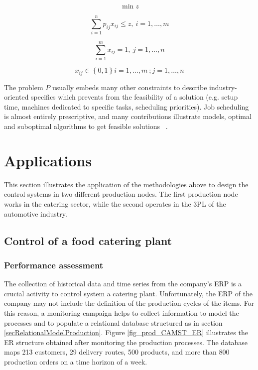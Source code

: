 \begin{equation}
    \min{z}
\end{equation}

\begin{equation}
    \sum_{i=1}^{n}{p_{ij}x_{ij}\le z,\ i=1,\ldots,m}
\end{equation}

\begin{equation}
    \sum_{i=1}^{m}{x_{ij}=1,\ j=1,\ldots,n}
\end{equation}

\begin{equation}
    x_{ij}\in\left\{0,1\right\}i=1,\ldots,m\ ;j=1,\ldots,n
\end{equation}

The problem $P$ usually embeds many other constraints to describe industry-oriented specifics which prevents from the feasibility of a solution (e.g. setup time, machines dedicated to specific tasks, scheduling priorities). Job scheduling is almost entirely prescriptive, and many contributions illustrate models, optimal and suboptimal algorithms to get feasible solutions ~\cite{Pinedo2009}.

\section{Applications}
This section illustrates the application of the methodologies above to design the control systems in two different production nodes. The first production node works in the catering sector, while the second operates in the 3PL of the automotive industry.

\subsection{Control of a food catering plant}

\subsubsection{Performance assessment}

The collection of historical data and time series from the company’s ERP is a crucial activity to control system a catering plant. Unfortunately, the ERP of the company may not include the definition of the production cycles of the items. For this reason, a monitoring campaign helps to collect information to model the processes and to populate a relational database structured as in section \ref{secRelationalModelProduction}. Figure \ref{fig_prod_CAMST_ER} illustrates the ER structure obtained after monitoring the production processes. The database maps 213 customers, 29 delivery routes, 500 products, and more than 800 production orders on a time horizon of a week.


